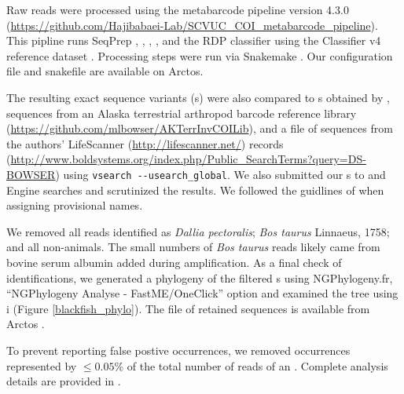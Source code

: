 \begin{multicols}{2} 

Raw reads were processed using the   metabarcode pipeline version 4.3.0 (\url{https://github.com/Hajibabaei-Lab/SCVUC_COI_metabarcode_pipeline}). This pipline runs SeqPrep \citep{StJohn2016},  \citep{Martin2011},  \citep{Rognes2016},  \citep{Edgar2016}, and the RDP classifier \citep{Wang2007} using the  Classifier v4 reference dataset \citep{PorterHajibabaei2018}. Processing steps were run via Snakemake \citep{KosterRahmann2012}. Our  configuration file \citep{Bowser2020config} and snakefile \citep{Bowser2020snakefile} are available on Arctos.

The resulting exact sequence variants (s) were also compared to s obtained by \citet{Bowseretal2020} \citep[dataset: ][]{Bowseretal2020sup5}, sequences from an Alaska terrestrial arthropod  barcode  reference library (\url{https://github.com/mlbowser/AKTerrInvCOILib}), and a  file of sequences from the authors' LifeScanner (\url{http://lifescanner.net/}) records (\url{http://www.boldsystems.org/index.php/Public_SearchTerms?query=DS-BOWSER}) using \verb|vsearch --usearch_global|. We also submitted our s to   \citep{Johnsonetal2008} and   Engine \citep{Ratnasinghametal2007} searches  and scrutinized the results. We followed the guidlines of \citet{Sigovinietal2016} when assigning provisional names.

We removed all reads identified as \textit{Dallia pectoralis}; \textit{Bos taurus} Linnaeus, 1758; and all non-animals. The small numbers of \textit{Bos taurus} reads likely came from bovine serum albumin added during  amplification. As a final check of identifications, we generated a phylogeny of the filtered s using NGPhylogeny.fr, ``NGPhylogeny Analyse - FastME/OneClick'' option \citep{DesperGascuel2002, CriscuoloGribaldo2010, JunierZdobnov2010, KatohStandley2013, Lefortetal2015, Lemoineetal2019} and examined the tree using i \citep{LetunicBork2019} (Figure \ref{blackfish_phylo}). The  file of retained  sequences is available from Arctos \citep{Bowser2020bfdfas}. 


To prevent reporting false postive occurrences, we removed occurrences represented by $\leq 0.05\%$ of the total number of reads of an . Complete analysis details are provided in \citet{bowser2020}.


\end{multicols}
